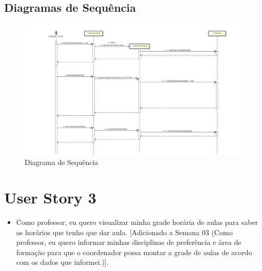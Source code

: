 \documentclass{abnt}
\begin{document}
		\FloatBarrier
		\begin{landscape}
		\subsection{Diagramas de Sequência}
						\begin{figure}[h]
							\begin{center}
							\includegraphics[width=500px]{SequenceDisponibilidade}
							\caption{Diagrama de Sequência}
							\label{fig:SequenceDisponibilidade}
							\end{center}				
						\end{figure}
						\FloatBarrier
		\end{landscape}
			
	\clearpage
	\section{User Story 3}

		\begin{itemize}
			\item Como professor, eu quero visualizar minha grade horária de aulas para saber os horários que tenho que dar aula.
			[Adicionado a Semana 03 (Como professor, eu quero informar minhas disciplinas de preferência e área de formação para que o coordenador 
			possa montar a grade de aulas de acordo com os dados que informei.)].
		\end{itemize}
		

		
\end{document}
